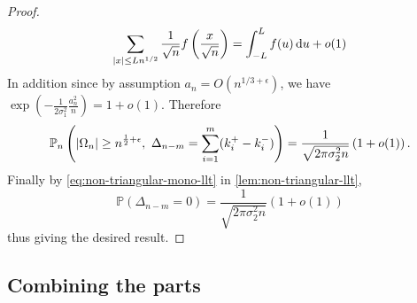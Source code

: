 \documentclass[draft]{scrartcl}
\newcommand{\littleo}{o}
\newcommand{\bigo}{O}
\DeclarePairedDelimiter{\abs}{\lvert}{\rvert}
\newcommand*\dif{\mathop{}\!\mathrm{d}}
\begin{document}
\begin{proof}
    \begin{equation}
        \sum_{\abs{x} \leq Ln^{1/2}} \frac{1}{\sqrt{n}} f\left( \frac{x}{\sqrt{n}} \right) = \int_{-L}^L f(u) \dif u + \littleo(1)
    \end{equation}    
    In addition since by assumption $a_n = \bigo(n^{1/3 + \epsilon})$, we have $\exp \left( - \frac{1}{2 \sigma_1^2} \frac{a_n^2}{n}\right) = 1 + \littleo(1)$. Therefore
    \begin{align}
        \mathbb P_n \left( \abs{\Omega_n} \geq n^{\frac{1}{2} + \epsilon},\ \Delta_{n-m} = \sum_{i=1}^m (k_i^+ - k_i^-) \right) = \frac{1}{\sqrt{2 \pi \sigma_2^2 n}} \left( 1 + \littleo(1) \right).
    \end{align}
    Finally by \cref{eq:non-triangular-mono-llt} in \cref{lem:non-triangular-llt},
    \begin{equation}
        \mathbb P \left( \Delta_{n-m} = 0 \right) = \frac{1}{\sqrt{2 \pi \sigma_2^2 n}}  (1 + \littleo(1))
    \end{equation}
    thus giving the desired result.
\end{proof}

\subsection{Combining the parts}
\end{document}

